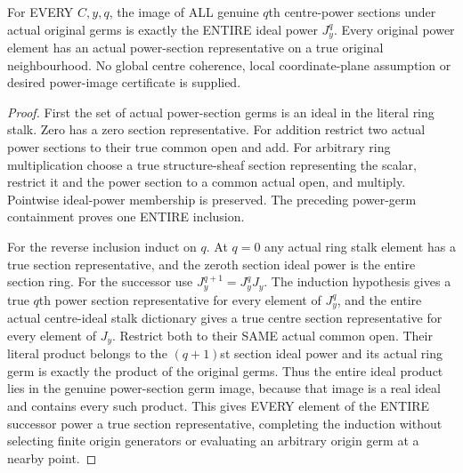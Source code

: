 \begin{theorem}
\label{hir:real-domain-actual-centre-power-section-whole-germ-image}
\leanok
For EVERY $C,y,q$, the image of ALL genuine $q$th centre-power sections
under actual original germs is exactly the ENTIRE ideal power $J_y^q$.
Every original power element has an actual power-section representative
on a true original neighbourhood. No global centre coherence, local
coordinate-plane assumption or desired power-image certificate is supplied.
\end{theorem}
\begin{proof}
First the set of actual power-section germs is an ideal in the literal
ring stalk. Zero has a zero section representative. For addition restrict
two actual power sections to their true common open and add. For arbitrary
ring multiplication choose a true structure-sheaf section representing
the scalar, restrict it and the power section to a common actual open,
and multiply. Pointwise ideal-power membership is preserved. The preceding
power-germ containment proves one ENTIRE inclusion.

For the reverse inclusion induct on $q$. At $q=0$ any actual ring stalk
element has a true section representative, and the zeroth section ideal
power is the entire section ring. For the successor use
$J_y^{q+1}=J_y^qJ_y$. The induction hypothesis gives a true $q$th power
section representative for every element of $J_y^q$, and the entire actual
centre-ideal stalk dictionary gives a true centre section representative
for every element of $J_y$. Restrict both to their SAME actual common
open. Their literal product belongs to the $(q+1)$st section ideal power
and its actual ring germ is exactly the product of the original germs.
Thus the entire ideal product lies in the genuine power-section germ
image, because that image is a real ideal and contains every such product.
This gives EVERY element of the ENTIRE successor power a true section
representative, completing the induction without selecting finite origin
generators or evaluating an arbitrary origin germ at a nearby point.
\end{proof}

